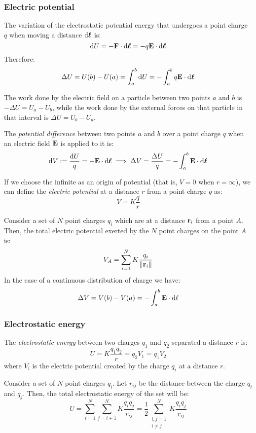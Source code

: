 \documentclass[../../../main.tex]{subfiles}
\begin{document}
\begin{multicols}{2}
  \subsubsection{Electric potential}
  \begin{prop}
    The variation of the electrostatic potential energy that undergoes a point charge $q$ when moving a distance $\dd\vb*{\ell}$ is:
    $$\dd U=-\boldsymbol{\mathrm{F}}\cdot \dd\vb*{\ell}=-q\boldsymbol{\mathrm{E}}\cdot \dd\vb*{\ell}$$
    Therefore:
    $$\Delta U=U(b)-U(a)=\int_a^b\dd U=-\int_a^bq\boldsymbol{\mathrm{E}}\cdot \dd \vb*{\ell}$$
  \end{prop}
  \begin{prop}
    The work done by the electric field on a particle between two points $a$ and $b$ is $-\Delta U=U_a-U_b$, while the work done by the external forces on that particle in that interval is $\Delta U=U_b-U_a$.
  \end{prop}
  \begin{definition}
    The \textit{potential difference} between two points $a$ and $b$ over a point charge $q$ when an electric field $\boldsymbol{\mathrm{E}}$ is applied to it is:
    $$\dd V:=\frac{\dd U}{q}=-\boldsymbol{\mathrm{E}}\cdot\dd \vb*{\ell}\implies\Delta V=\frac{\Delta U}{q}=-\int_a^b\boldsymbol{\mathrm{E}}\cdot\dd \vb*{\ell}$$
  \end{definition}
  \begin{definition}
    If we choose the infinite as an origin of potential (that is, $V=0$ when $r=\infty$), we can define the \textit{electric potential} at a distance $r$ from a point charge $q$ as: $$V=K\frac{q}{r}$$
  \end{definition}
  \begin{principle}
    Consider a set of $N$ point charges $q_i$ which are at a distance $\boldsymbol{\mathrm{r}}_i$ from a point $A$. Then, the total electric potential exerted by the $N$ point charges on the point $A$ is:
    $$V_A=\sum_{i=1}^NK\frac{q_i}{\|\boldsymbol{\mathrm{r}}_{i}\|}$$
    In the case of a continuous distribution of charge we have:
    $$\Delta V=V(b)-V(a)=-\int_a^b\boldsymbol{\mathrm{E}}\cdot\dd\ell$$
  \end{principle}
  \subsubsection{Electrostatic energy}
  \begin{definition}
    The \textit{electrostatic energy} between two charges $q_1$ and $q_2$ separated a distance $r$ is: $$U=K\frac{q_1q_2}{r}=q_2V_1=q_1V_2$$
    where $V_i$ is the electric potential created by the charge $q_i$ at a distance $r$.
  \end{definition}
  \begin{prop}
    Consider a set of $N$ point charges $q_i$. Let $r_{ij}$ be the distance between the charge $q_i$ and $q_j$. Then, the total electrostatic energy of the set will be: $$U=\sum_{i=1}^N\sum_{j=i+1}^NK\frac{q_iq_j}{r_{ij}}=\frac{1}{2}\sum_{\substack{i,j=1\\i\ne j}}^NK\frac{q_iq_j}{r_{ij}}$$
  \end{prop}

\end{multicols}
\end{document}
